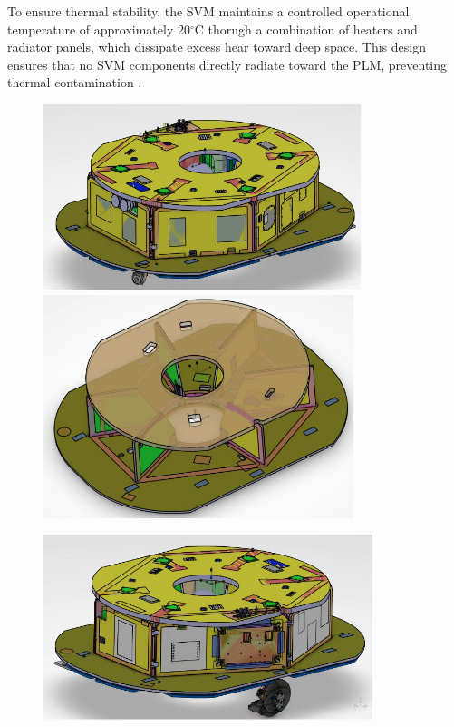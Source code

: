 \documentclass[12pt]{article}
\begin{document}
To ensure thermal stability, the SVM maintains a controlled operational temperature of approximately 20$^{\circ}$C thorugh a combination of heaters and radiator panels, which dissipate excess hear toward deep space. This design ensures that no SVM components directly radiate toward
the PLM, preventing thermal contamination \cite{arielassessreport,morgante2022thermal}.

\begin{figure}[H]
    \centering
    \begin{minipage}{.4\textwidth}
        \includegraphics[width=\linewidth]{ariel svm1.png}
        \vfill
        \includegraphics[width=\linewidth]{ariel core1.png}
    \end{minipage}
    \hspace{-.5em}
    \begin{minipage}{.4\textwidth}
        \includegraphics[width=\linewidth]{ariel svm2.png}

\end{minipage}
\end{figure}
\end{document}
